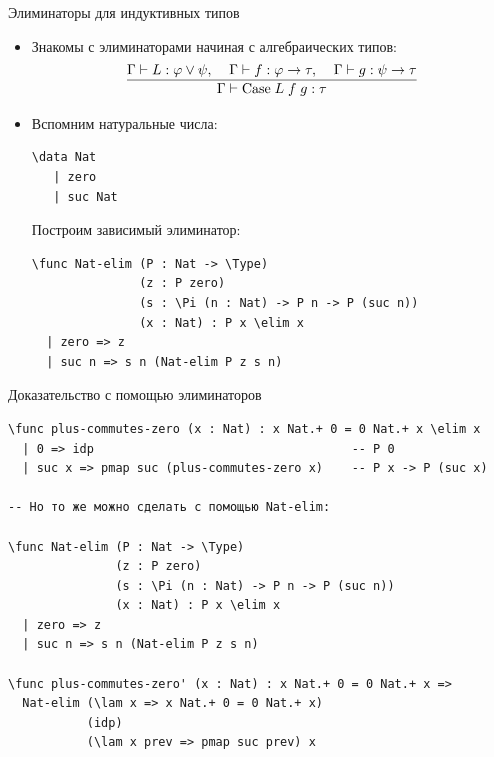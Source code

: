 \documentclass[aspectratio=169]{beamer}
\begin{document}
\begin{frame}[fragile]{Элиминаторы для индуктивных типов}
\begin{itemize}
\item Знакомы с элиминаторами начиная с алгебраических типов:
$$\infer{\Gamma \vdash \text{Case} \; L \; f \; g : \tau}{\Gamma \vdash L: \varphi \vee \psi, \;\;\;\; \Gamma \vdash f : \varphi \to \tau, \;\;\;\; \Gamma \vdash g: \psi \to \tau}$$

\item Вспомним натуральные числа:

\small\color[HTML]{025002}\begin{verbatim}
\data Nat 
   | zero
   | suc Nat
\end{verbatim}\normalsize
\color{black}

Построим зависимый элиминатор:

\small\color[HTML]{025002}\begin{verbatim}
\func Nat-elim (P : Nat -> \Type)
               (z : P zero)
               (s : \Pi (n : Nat) -> P n -> P (suc n))
               (x : Nat) : P x \elim x
  | zero => z
  | suc n => s n (Nat-elim P z s n)
\end{verbatim}\normalsize
\color{black}

\end{itemize}
\end{frame}

\begin{frame}[fragile]{Доказательство с помощью элиминаторов}
\small\color[HTML]{025002}\begin{verbatim}
\func plus-commutes-zero (x : Nat) : x Nat.+ 0 = 0 Nat.+ x \elim x
  | 0 => idp                                    -- P 0
  | suc x => pmap suc (plus-commutes-zero x)    -- P x -> P (suc x)

-- Но то же можно сделать с помощью Nat-elim:

\func Nat-elim (P : Nat -> \Type)
               (z : P zero)
               (s : \Pi (n : Nat) -> P n -> P (suc n))
               (x : Nat) : P x \elim x
  | zero => z
  | suc n => s n (Nat-elim P z s n)

\func plus-commutes-zero' (x : Nat) : x Nat.+ 0 = 0 Nat.+ x =>
  Nat-elim (\lam x => x Nat.+ 0 = 0 Nat.+ x) 
           (idp) 
           (\lam x prev => pmap suc prev) x
\end{verbatim}\normalsize
\color{black}
\end{frame}
\end{document}
